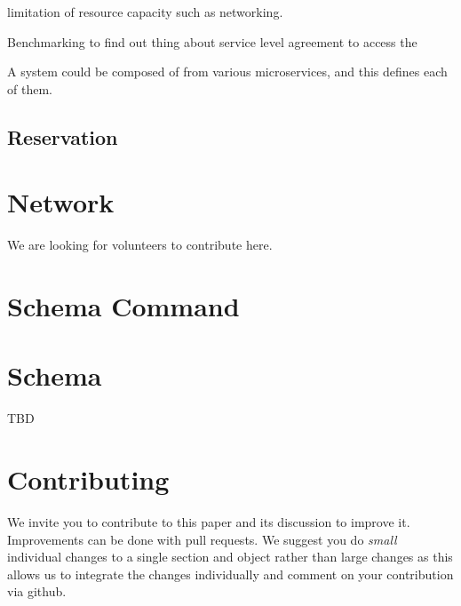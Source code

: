 \documentclass[9pt,twocolumn,twoside]{styles/osajnl}
\begin{document}
limitation of resource capacity such as networking. 
 
Benchmarking to find out thing about service level agreement to access
the 


A system could be composed of from various microservices, and this defines
each of them.



\subsection{Reservation}


\section{Network}

We are looking for volunteers to contribute here.

\newpage

\appendix

\section{Schema Command}



\section{Schema}\label{a:schema}

TBD


\section{Contributing}

We invite you to contribute to this paper and its discussion to
improve it. Improvements can be done with pull requests. We suggest
you do {\em small} individual changes to a single section and object
rather than large changes as this allows us to integrate the changes
individually and comment on your contribution via github.
\end{document}
